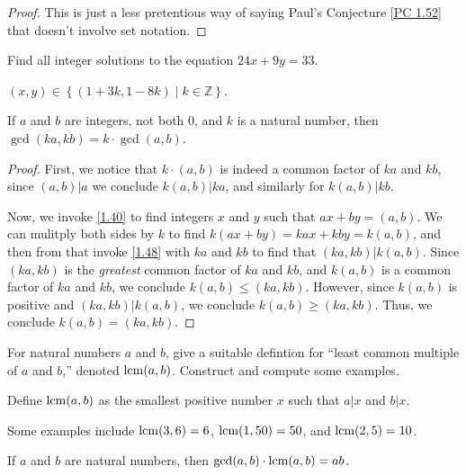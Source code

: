 \documentclass[../main.tex]{subfiles}
\begin{document}
\begin{proof}
  This is just a less pretentious way of saying Paul's Conjecture \ref{PC 1.52} that doesn't involve set notation.
\end{proof}



\begin{ex} \label{1.54}
  Find all integer solutions to the equation $24x + 9y = 33$.
\end{ex}

$(x, y) \in \left\{(1+3k, 1-8k) \mid k \in \mathbb{Z} \right\}$.



\begin{thm} \label{1.55}
  If $a$ and $b$ are integers, not both $0$, and $k$ is a natural number, then $\gcd (ka, kb) = k \cdot \gcd (a, b)$.
\end{thm}

\begin{proof}
  First, we notice that $k \cdot (a, b)$ is indeed a common factor of $ka$ and $kb$, since $(a,b) | a$ we conclude $k(a, b) | ka$, and similarly for $k(a, b) | kb$.

  Now, we invoke \ref{1.40} to find integers $x$ and $y$ such that $ax + by = (a,b)$. We can mulitply both sides by $k$ to find $k(ax+by) = kax + kby = k(a,b)$, and then from that invoke \ref{1.48} with $ka$ and $kb$ to find that $(ka, kb) | k(a,b)$. Since $(ka,kb)$ is the \emph{greatest} common factor of $ka$ and $kb$, and $k(a,b)$ is a common factor of $ka$ and $kb$, we conclude $k(a,b) \leq (ka, kb)$.
  However, since $k(a,b)$ is positive and $(ka,kb) | k(a,b)$, we conclude $k(a,b) \geq (ka, kb)$. Thus, we conclude $k(a,b) = (ka, kb)$.
\end{proof}



\begin{ex} \label{1.56}
  For natural numbers $a$ and $b$, give a suitable defintion for ``least common multiple of $a$ and $b$,'' denoted $\operatorname{lcm} (a,b)$. Construct and compute some examples.
\end{ex}

Define $\operatorname{lcm} (a, b)$ as the smallest positive number $x$ such that $a | x$ and $b | x$.

Some examples include $\operatorname{lcm} (3, 6) = 6$, $\operatorname{lcm} (1, 50) = 50$, and $\operatorname{lcm}(2, 5) = 10$.



\begin{thm} \label{1.57}
  If $a$ and $b$ are natural numbers, then $\gcd (a, b) \cdot \operatorname{lcm} (a, b) = ab$.
\end{thm}
\end{document}
